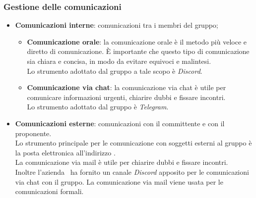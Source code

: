        \subsubsection{Gestione delle comunicazioni}
            \begin{itemize}
                \item \textbf{Comunicazioni interne}: comunicazioni tra i membri del gruppo;
                \begin{itemize}
                    \item \textbf{Comunicazione orale}: la comunicazione orale è il metodo più veloce e diretto di comunicazione. È importante che questo tipo di comunicazione sia chiara e concisa, in modo da evitare equivoci e malintesi. \\
                    Lo strumento adottato dal gruppo a tale scopo è \textit{Discord}.
                    \item \textbf{Comunicazione via chat}: la comunicazione via chat è utile per comunicare informazioni urgenti, chiarire dubbi e fissare incontri.  \\
                    Lo strumento adottato dal gruppo è \textit{Telegram}.
                \end{itemize}
                \item \textbf{Comunicazioni esterne}: comunicazioni con il committente e con il proponente. \\
                Lo strumento principale per le comunicazione con soggetti esterni al gruppo è la posta elettronica all'indirizzo \groupMail. \\
                La comunicazione via mail è utile per chiarire dubbi e fissare incontri.  \\
                Inoltre l'azienda \companyName\ ha fornito un canale \textit{Discord} apposito per le comunicazioni via chat con il gruppo.
                La comunicazione via mail viene usata per le comunicazioni formali. \\
            
            \end{itemize}

